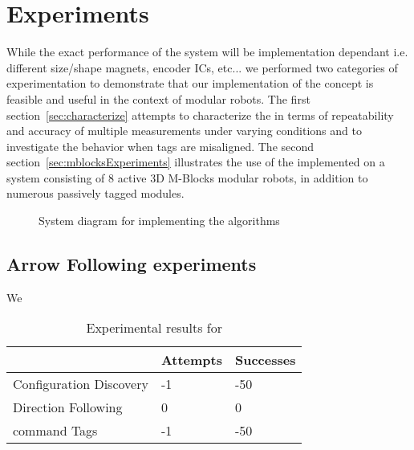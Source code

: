 \section{Experiments}
\label{sec:Experiments}
While the exact performance of the \tagName system will be implementation dependant i.e. different size/shape magnets, encoder ICs, etc... we performed two categories of experimentation to demonstrate that our implementation of the \tagName concept is feasible and useful in the context of modular robots. The first section~\ref{sec:characterize} attempts to characterize the \tagNamePlural in terms of repeatability and accuracy of multiple measurements under varying conditions and to investigate the behavior when tags are misaligned. The second section~\ref{sec:mblocksExperiments} illustrates the use of the \tagNamePlural implemented on a system consisting of 8 active 3D M-Blocks modular robots, in addition to numerous passively tagged modules.

\begin{figure}[ht]

	
	
	
	\caption{System diagram for implementing the algorithms}
	
	\label{fig:PlaneChanging2}
\end{figure}



\subsection{Arrow Following experiments}
\label{sec:mblocksExperimentsArrow}
We 

\begin{table}[h]
	\caption{Experimental results for }
	
	\begin{tabular}{ p{3.4cm}  p{1.9cm}  p{1.9cm} }
		\hline
								& Attempts 	& Successes \\
		\hline
		Configuration Discovery	&  -1 		& -50 \\
		Direction Following		& 0 		& 0  \\
		command Tags 			&  -1 		& -50 \\		
	\end{tabular}
	
	\label{tab:info}
\end{table}

